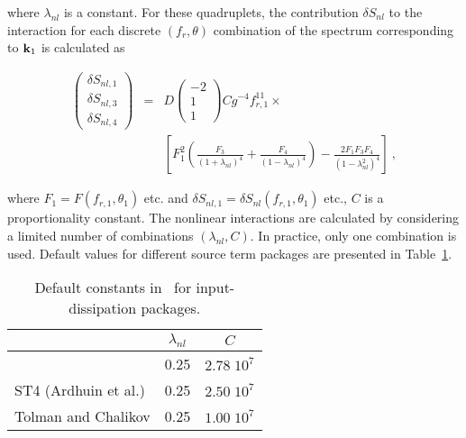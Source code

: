 \noindent
where $\lambda_{nl}$ is a constant. For these quadruplets, the contribution
$\delta S_{nl}$ to the interaction for each discrete $(f_r,\theta)$
combination of the spectrum corresponding to $\mbox{\bf k}_1$ is calculated as


\begin{eqnarray}
\left ( \begin{array}{c}
  \delta S_{nl,1} \\ \delta S_{nl,3} \\ \delta S_{nl,4}
\end{array} \right ) & = & D
\left ( \begin{array}{r} -2 \\ 1 \\ 1 \end{array} \right )
C g^{-4} f_{r,1}^{11} \times \nonumber \\
& & \left [ F_1^2
\left ( \frac{F_3}{(1+\lambda_{nl})^4} +
        \frac{F_4}{(1-\lambda_{nl})^4} \right ) -
\frac{2 F_1 F_3 F_4}{(1-\lambda_{nl}^2)^4}
\right ] \: , \label{eq:snl_dia}
\end{eqnarray}

\noindent
where $F_1 = F(f_{r,1} ,\theta_1 )$ etc. and $\delta S_{nl,1} = \delta
S_{nl}(f_{r,1} ,\theta_1 )$ etc., $C$ is a proportionality constant. The
nonlinear interactions are calculated by considering a limited number of
combinations $(\lambda_{nl},C)$. In practice, only one combination is
used. Default values for different source term packages are presented in
Table~\ref{tab:snl_par}.



\begin{table} \begin{center}
 \begin{tabular}{|l|c|c|} \hline \hline
                    & $\lambda_{nl}$ &     $C$      \\ \hline
\wam-3              &      0.25      & $2.78 \; 10^7$  \\ \hline
ST4 (Ardhuin et al.)&      0.25      & $2.50 \; 10^7$  \\ \hline
Tolman and Chalikov &      0.25      & $1.00 \; 10^7$  \\ \hline \hline
\end{tabular} \end{center}
\caption{Default constants in \dia\ for input-dissipation packages.}
\label{tab:snl_par} \botline \end{table}

